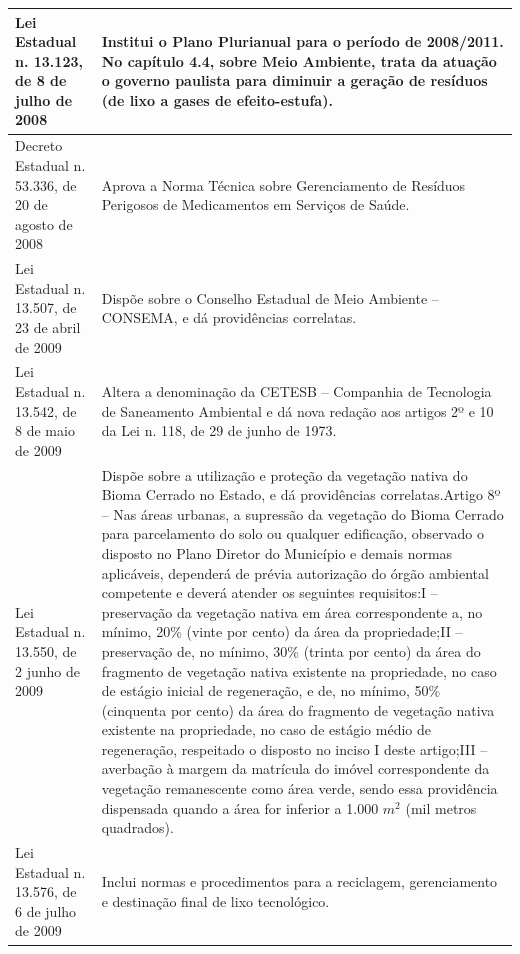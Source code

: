 \begin{center}
\begin{longtable}{|p{}|p{}|}
			\hline
			Lei Estadual n. 13.123, de 8 de julho de 2008 & Institui o Plano Plurianual para o período de 2008/2011. No capítulo 4.4, sobre Meio Ambiente, trata da atuação o governo paulista para diminuir a geração de resíduos (de lixo a gases de efeito-estufa). \\
			\hline
			Decreto Estadual n. 53.336, de 20 de agosto de 2008 & Aprova  a  Norma  Técnica  sobre  Gerenciamento  de  Resíduos  Perigosos  de Medicamentos em Serviços de Saúde. \\
			\hline
			Lei  Estadual  n.  13.507,  de  23 de abril de 2009 & Dispõe  sobre  o  Conselho  Estadual  de  Meio  Ambiente  –  CONSEMA,  e  dá providências correlatas. \\
			\hline
			Lei Estadual n. 13.542, de 8 de maio de 2009 & Altera a denominação da CETESB – Companhia de Tecnologia de Saneamento Ambiental e dá nova redação aos artigos 2º e 10 da Lei n. 118, de 29 de junho de 1973. \\
			\hline
			Lei  Estadual  n.  13.550,  de  2 junho de 2009 & Dispõe sobre a utilização e proteção da vegetação nativa do Bioma Cerrado no Estado, e dá providências correlatas.\newline{}Artigo  8º  –  Nas  áreas  urbanas,  a  supressão  da  vegetação  do  Bioma  Cerrado para  parcelamento  do  solo  ou  qualquer  edificação,  observado  o  disposto  no Plano  Diretor  do  Município  e  demais  normas  aplicáveis,  dependerá  de  prévia autorização  do  órgão  ambiental  competente  e  deverá  atender  os  seguintes requisitos:\newline{}I  –  preservação  da  vegetação  nativa  em  área  correspondente  a,  no  mínimo, 20\% (vinte por cento) da área da propriedade;\newline{}II – preservação de, no mínimo, 30\% (trinta por cento) da área do fragmento de vegetação  nativa  existente  na  propriedade,  no  caso  de  estágio  inicial  de regeneração, e de, no mínimo, 50\% (cinquenta por cento) da área do fragmento de  vegetação  nativa  existente  na  propriedade,  no  caso  de  estágio  médio  de regeneração, respeitado o disposto no inciso I deste artigo;\newline{}III – averbação à margem da matrícula do imóvel correspondente da vegetação remanescente como área verde, sendo essa providência dispensada  quando a área for inferior a 1.000 $m^2$ (mil metros quadrados). \\
			\hline
			Lei Estadual n. 13.576, de 6 de julho de 2009 & Inclui normas e procedimentos para a reciclagem, gerenciamento e destinação final de lixo tecnológico. \\

\end{longtable}
\end{center}
